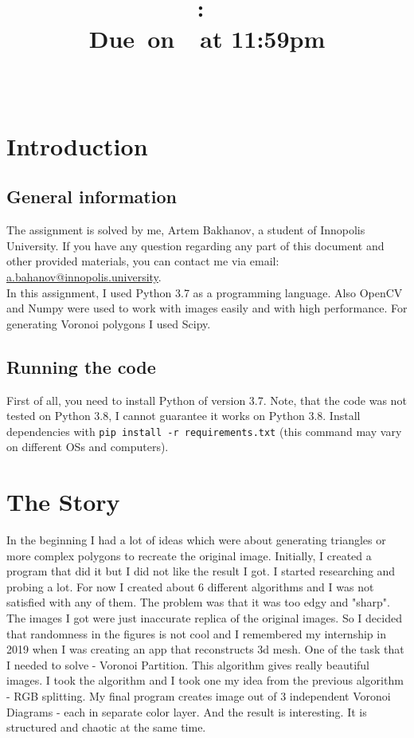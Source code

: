 \documentclass{article}
\title{
    \vspace{2in}
    \textmd{\textbf{\hmwkClass:\ \hmwkTitle}}\\
    \normalsize\vspace{0.1in}\small{Due\ on\ \hmwkDueDate\ at 11:59pm}\\
    \vspace{0.1in}\large{\textit{\hmwkClassInstructor\ }}
    \vspace{3in}
}
\author{\hmwkAuthorName}
\date{}
\begin{document}
\maketitle

\pagebreak

\tableofcontents

\pagebreak

\section{Introduction}
\subsection{General information}
    The assignment is solved by me, Artem Bakhanov, a student of Innopolis University. If you have any question regarding any part of this document and other provided materials, you can contact me via email: \href{mailto:a.bahanov@innopolis.university}{a.bahanov@innopolis.university}.\\
    In this assignment, I used Python 3.7 as a programming language. Also OpenCV and Numpy were used to work with images easily and with high performance. For generating Voronoi polygons I used Scipy.
\subsection{Running the code}
First of all, you need to install Python of version 3.7. Note, that the code was not tested on Python 3.8, I cannot guarantee it works on Python 3.8. Install dependencies with \texttt{pip install -r requirements.txt} (this command may vary on different OSs and computers).

\section{The Story}
In the beginning I had a lot of ideas which were about generating triangles or more complex polygons to recreate the original image. Initially, I created a program that did it but I did not like the result I got. I started researching and probing a lot. For now I created about 6 different algorithms and I was not satisfied with any of them. The problem was that it was too edgy and "sharp". The images I got were just inaccurate replica of the original images. So I decided that randomness in the figures is not cool and I remembered my internship in 2019 when I was creating an app that reconstructs 3d mesh. One of the task that I needed to solve - Voronoi Partition. This algorithm gives really beautiful images. I took the algorithm and I took one my idea from the previous algorithm - RGB splitting. My final program creates image out of 3 independent Voronoi Diagrams - each in separate color layer. And the result is interesting. It is structured and chaotic at the same time.
\end{document}
